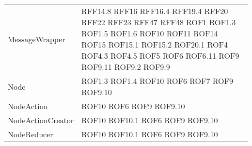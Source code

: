 \begin{longtable}{p{5cm}!{\VRule[1pt]}p{2.5cm}}
	MessageWrapper & RFF14.8 \newline RFF16 \newline RFF16.4 \newline RFF19.4 \newline RFF20 \newline RFF22 \newline RFF23 \newline RFF47 \newline RFF48 \newline ROF1 \newline ROF1.3 \newline ROF1.5 \newline ROF1.6 \newline ROF10 \newline ROF11 \newline ROF14 \newline ROF15 \newline ROF15.1 \newline ROF15.2 \newline ROF20.1 \newline ROF4 \newline ROF4.3 \newline ROF4.5 \newline ROF5 \newline ROF6 \newline ROF6.11 \newline ROF9 \newline ROF9.11 \newline ROF9.2 \newline ROF9.9\\
	Node & ROF1.3 \newline ROF1.4 \newline ROF10 \newline ROF6 \newline ROF7 \newline ROF9 \newline ROF9.10\\
	NodeAction & ROF10 \newline ROF6 \newline ROF9 \newline ROF9.10\\
	NodeActionCreator & ROF10 \newline ROF10.1 \newline ROF6 \newline ROF9 \newline ROF9.10\\
	NodeReducer & ROF10 \newline ROF10.1 \newline ROF6 \newline ROF9 \newline ROF9.10\\

\end{longtable}
